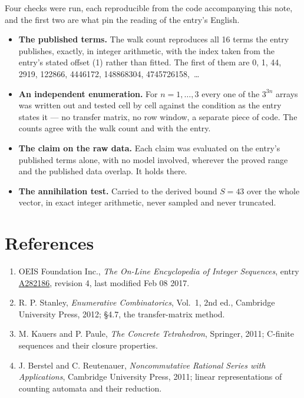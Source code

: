 \documentclass[11pt]{article}
\theoremstyle{definition}
\begin{document}
Four checks were run, each reproducible from the code accompanying this note, and the first two are what pin the reading of the entry's English.

\begin{itemize}

\item {\bfseries The published terms.} The walk count reproduces all 16 terms the entry publishes, exactly, in integer arithmetic, with the index taken from the entry's stated offset (1) rather than fitted. The first of them are 0, 1, 44, 2919, 122866, 4446172, 148868304, 4745726158,~\dots

\item {\bfseries An independent enumeration.} For $n = 1,\dots,3$ every one of the $3^{3n}$ arrays was written out and tested cell by cell against the condition as the entry states it --- no transfer matrix, no row window, a separate piece of code. The counts agree with the walk count and with the entry.

\item {\bfseries The claim on the raw data.} Each claim was evaluated on the entry's published terms alone, with no model involved, wherever the proved range and the published data overlap. It holds there.

\item {\bfseries The annihilation test.} Carried to the derived bound $S = 43$ over the whole vector, in exact integer arithmetic, never sampled and never truncated.

\end{itemize}

\section{References}

\begin{enumerate}

\item OEIS Foundation Inc., \emph{The On-Line Encyclopedia of Integer Sequences}, entry \href{https://oeis.org/A282186}{A282186}, revision 4, last modified Feb 08 2017.

\item R. P. Stanley, \emph{Enumerative Combinatorics}, Vol.~1, 2nd ed., Cambridge University Press, 2012; \S4.7, the transfer-matrix method.

\item M. Kauers and P. Paule, \emph{The Concrete Tetrahedron}, Springer, 2011; C-finite sequences and their closure properties.

\item J. Berstel and C. Reutenauer, \emph{Noncommutative Rational Series with Applications}, Cambridge University Press, 2011; linear representations of counting automata and their reduction.

\end{enumerate}
\end{document}
